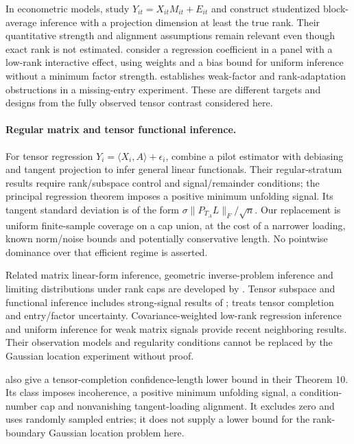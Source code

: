 \documentclass[11pt]{article}
\theoremstyle{remark}
\newcommand{\ip}[2]{\langle #1,#2\rangle}
\newcommand{\norm}[1]{\lVert #1\rVert}
\begin{document}
In econometric models, \citet{choi2026} study $Y_{it}=X_{it}M_{it}+E_{it}$ and construct studentized block-average inference with a projection dimension at least the true rank. Their quantitative strength and alignment assumptions remain relevant even though exact rank is not estimated. \citet{armstrong2026} consider a regression coefficient in a panel with a low-rank interactive effect, using weights and a bias bound for uniform inference without a minimum factor strength. \citet{zhu2019} establishes weak-factor and rank-adaptation obstructions in a missing-entry experiment. These are different targets and designs from the fully observed tensor contrast considered here.

\paragraph{Regular matrix and tensor functional inference.}
For tensor regression $Y_i=\ip{X_i}A+\epsilon_i$, \citet{xu2025} combine a pilot estimator with debiasing and tangent projection to infer general linear functionals. Their regular-stratum results require rank/subspace control and signal/remainder conditions; the principal regression theorem imposes a positive minimum unfolding signal. Its tangent standard deviation is of the form $\sigma\norm{P_{T_A}L}_F/\sqrt n$. Our replacement is uniform finite-sample coverage on a cap union, at the cost of a narrower loading, known norm/noise bounds and potentially conservative length. No pointwise dominance over that efficient regime is asserted.

Related matrix linear-form inference, geometric inverse-problem inference and limiting distributions under rank caps are developed by \citet{xiayuan2021,cailiangrakhlin2016,carpentierkim2018}. Tensor subspace and functional inference includes strong-signal results of \citet{xiazhangzhou2022,agterberg2024}; \citet{caipoorchen2023} treats tensor completion and entry/factor uncertainty. Covariance-weighted low-rank regression inference \citep{ke2026} and uniform inference for weak matrix signals \citep{bykhovskaya2025} provide recent neighboring results. Their observation models and regularity conditions cannot be replaced by the Gaussian location experiment without proof.

\citet{madu2026} also give a tensor-completion confidence-length lower bound in their Theorem 10. Its class imposes incoherence, a positive minimum unfolding signal, a condition-number cap and nonvanishing tangent-loading alignment. It excludes zero and uses randomly sampled entries; it does not supply a lower bound for the rank-boundary Gaussian location problem here.
\end{document}
